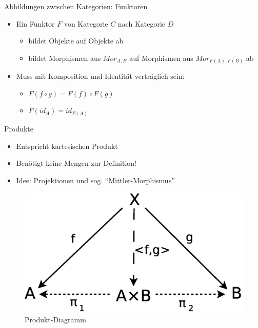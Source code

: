 \documentclass{beamer}
\begin{document}
\begin{frame}{Abbildungen zwischen Kategorien: Funktoren}
  \begin{itemize}
  \item Ein Funktor $F$ von Kategorie $C$ nach Kategorie $D$
    \begin{itemize}
    \item bildet Objekte auf Objekte ab
    \item bildet Morphismen aus $Mor_{A,B}$ auf Morphismen aus
      $Mor_{F(A),F(B)}$ ab 
    \end{itemize}   
  \item Muss mit Komposition und Identität verträglich sein:
    \begin{itemize}
    \item $F(f \circ g) = F(f) \circ F(g)$
    \item $F(id_A) = id_{F(A)}$
    \end{itemize}
  \end{itemize}   
\end{frame}

\begin{frame}{Produkte}
  \begin{itemize}
  \item Entspricht kartesischen Produkt
  \item Benötigt keine Mengen zur Definition!
  \item Idee: Projektionen und sog. "`Mittler-Morphismus"'
  \end{itemize}
  \begin{figure}
    \centering
    \includegraphics[scale=0.3]{images/cat_product}
    \caption{Produkt-Diagramm}
  \end{figure}
\end{frame}
\end{document}
